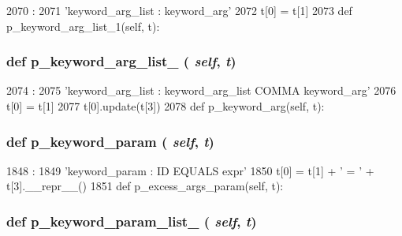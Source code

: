 \begin{DoxyCode}
2070                                      :
2071         'keyword_arg_list : keyword_arg'
2072         t[0] = t[1]
2073 
    def p_keyword_arg_list_1(self, t):
\end{DoxyCode}
\hypertarget{classisa__parser_1_1ISAParser_aa1fb05e4bd5ab7918585d14d1d69ec9d}{
\subsubsection[{p\_\-keyword\_\-arg\_\-list\_\-1}]{\setlength{\rightskip}{0pt plus 5cm}def p\_\-keyword\_\-arg\_\-list\_ ( {\em self}, \/   {\em t})}}
\label{classisa__parser_1_1ISAParser_aa1fb05e4bd5ab7918585d14d1d69ec9d}



\begin{DoxyCode}
2074                                      :
2075         'keyword_arg_list : keyword_arg_list COMMA keyword_arg'
2076         t[0] = t[1]
2077         t[0].update(t[3])
2078 
    def p_keyword_arg(self, t):
\end{DoxyCode}
\hypertarget{classisa__parser_1_1ISAParser_a6fa985fad0d498755497e9ce8ebcaa45}{
\subsubsection[{p\_\-keyword\_\-param}]{\setlength{\rightskip}{0pt plus 5cm}def p\_\-keyword\_\-param ( {\em self}, \/   {\em t})}}
\label{classisa__parser_1_1ISAParser_a6fa985fad0d498755497e9ce8ebcaa45}



\begin{DoxyCode}
1848                                 :
1849         'keyword_param : ID EQUALS expr'
1850         t[0] = t[1] + ' = ' + t[3].__repr__()
1851 
    def p_excess_args_param(self, t):
\end{DoxyCode}
\hypertarget{classisa__parser_1_1ISAParser_a5e897854531c70c03e3d4a2b5b274df7}{
\subsubsection[{p\_\-keyword\_\-param\_\-list\_\-0}]{\setlength{\rightskip}{0pt plus 5cm}def p\_\-keyword\_\-param\_\-list\_ ( {\em self}, \/   {\em t})}}
\label{classisa__parser_1_1ISAParser_a5e897854531c70c03e3d4a2b5b274df7}



